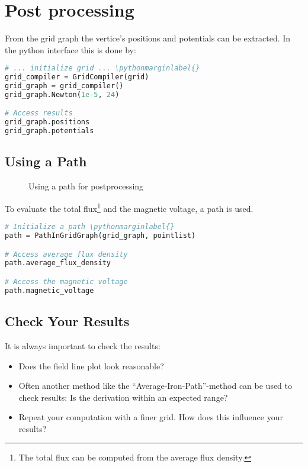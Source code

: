 \section{Post processing}
\label{sec:postprocessing}

From the grid graph the vertice's positions and potentials can be
extracted.
In the python interface this is done by:
\begin{lstlisting}[language=python]
# ... initialize grid ... \pythonmarginlabel{}
grid_compiler = GridCompiler(grid)
grid_graph = grid_compiler()
grid_graph.Newton(1e-5, 24)

# Access results
grid_graph.positions
grid_graph.potentials
\end{lstlisting}

\subsection{Using a Path}
\label{sec:using-path}

\begin{figure}
  \centering
  \begin{maxipage}
     \hfil
    \hfil
    \hfil
  \caption{Using a path for postprocessing}
  \label{fig:UsePath}
  \end{maxipage}
\end{figure}
To evaluate the total flux\footnote{The total flux can be computed
from the average flux density.} and the magnetic voltage, a path is
used.
\begin{lstlisting}[language=python,texcl]
# Initialize a path \pythonmarginlabel{}
path = PathInGridGraph(grid_graph, pointlist)

# Access average flux density
path.average_flux_density

# Access the magnetic voltage
path.magnetic_voltage
\end{lstlisting}

\subsection{Check Your Results}

It is always important to check the results:
\begin{itemize}
\item Does the field line plot look reasonable?
\item Often another method like the ``Average-Iron-Path''-method can
  be used to check results:  Is the derivation within an expected range?
\item Repeat your computation with a finer grid.  How does this
  influence your results?
\end{itemize}


